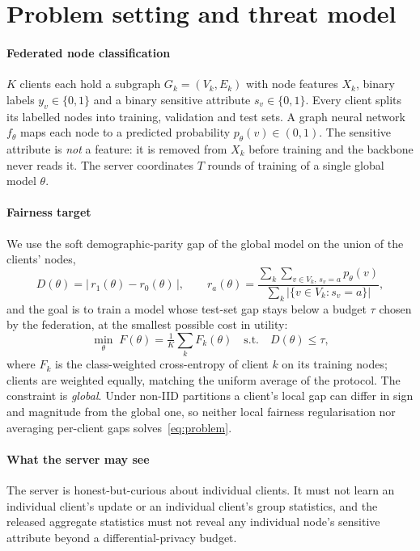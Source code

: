 \section{Problem setting and threat model}\label{sec:problem}

\paragraph{Federated node classification}
$K$ clients each hold a subgraph $G_k=(V_k,E_k)$ with node features $X_k$, binary labels $y_v\in\{0,1\}$ and a binary sensitive attribute $s_v\in\{0,1\}$. Every client splits its labelled nodes into training, validation and test sets. A graph neural network $f_\theta$ maps each node to a predicted probability $p_\theta(v)\in(0,1)$. The sensitive attribute is \emph{not} a feature: it is removed from $X_k$ before training and the backbone never reads it. The server coordinates $T$ rounds of training of a single global model $\theta$.

\paragraph{Fairness target}
We use the soft demographic-parity gap of the global model on the union of the clients' nodes,
\begin{equation}\label{eq:dpd}
D(\theta)=\bigl|\,r_1(\theta)-r_0(\theta)\,\bigr|,\qquad r_a(\theta)=\frac{\sum_k\sum_{v\in V_k,\,s_v=a}p_\theta(v)}{\sum_k|\{v\in V_k:s_v=a\}|},
\end{equation}
and the goal is to train a model whose test-set gap stays below a budget $\tau$ chosen by the federation, at the smallest possible cost in utility:
\begin{equation}\label{eq:problem}
\min_\theta\; F(\theta)=\tfrac{1}{K}\textstyle\sum_k F_k(\theta)\quad\text{s.t.}\quad D(\theta)\le\tau ,
\end{equation}
where $F_k$ is the class-weighted cross-entropy of client $k$ on its training nodes; clients are weighted equally, matching the uniform average of the protocol.
The constraint is \emph{global}. Under non-IID partitions a client's local gap can differ in sign and magnitude from the global one, so neither local fairness regularisation nor averaging per-client gaps solves~\eqref{eq:problem}.

\paragraph{What the server may see}
The server is honest-but-curious about individual clients. It must not learn an individual client's update or an individual client's group statistics, and the released aggregate statistics must not reveal any individual node's sensitive attribute beyond a differential-privacy budget.

